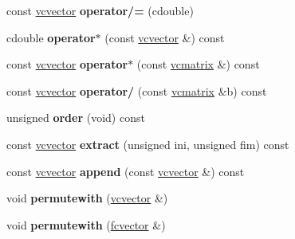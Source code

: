 \begin{DoxyCompactItemize}
\item 
const \hyperlink{classvcvector}{vcvector} {\bfseries operator/=} (cdouble)\hypertarget{classvcvector_ad7199f07b38e269bf8ae4dc72dceeb0d}{}\label{classvcvector_ad7199f07b38e269bf8ae4dc72dceeb0d}

\item 
cdouble {\bfseries operator$\ast$} (const \hyperlink{classvcvector}{vcvector} \&) const \hypertarget{classvcvector_a02c59cbf19976675c877bc0cfddc995a}{}\label{classvcvector_a02c59cbf19976675c877bc0cfddc995a}

\item 
const \hyperlink{classvcvector}{vcvector} {\bfseries operator$\ast$} (const \hyperlink{classvcmatrix}{vcmatrix} \&) const \hypertarget{classvcvector_a2ec6afa52a798942f721e375b96774cc}{}\label{classvcvector_a2ec6afa52a798942f721e375b96774cc}

\item 
const \hyperlink{classvcvector}{vcvector} {\bfseries operator/} (const \hyperlink{classvcmatrix}{vcmatrix} \&b) const \hypertarget{classvcvector_a510b7cf832d55c1f82e3941ec8645391}{}\label{classvcvector_a510b7cf832d55c1f82e3941ec8645391}

\item 
unsigned {\bfseries order} (void) const \hypertarget{classvcvector_ae698b7365cde3a60c82346e7cf63dec6}{}\label{classvcvector_ae698b7365cde3a60c82346e7cf63dec6}

\item 
const \hyperlink{classvcvector}{vcvector} {\bfseries extract} (unsigned ini, unsigned fim) const \hypertarget{classvcvector_a8ee3d0ed796d83154a02dce446b699f2}{}\label{classvcvector_a8ee3d0ed796d83154a02dce446b699f2}

\item 
const \hyperlink{classvcvector}{vcvector} {\bfseries append} (const \hyperlink{classvcvector}{vcvector} \&) const \hypertarget{classvcvector_a0c3e10d7660127d0ca88e2d85bed7f92}{}\label{classvcvector_a0c3e10d7660127d0ca88e2d85bed7f92}

\item 
void {\bfseries permutewith} (\hyperlink{classvcvector}{vcvector} \&)\hypertarget{classvcvector_a867aaddc6e2c902bf97d3f838af537cc}{}\label{classvcvector_a867aaddc6e2c902bf97d3f838af537cc}

\item 
void {\bfseries permutewith} (\hyperlink{classfcvector}{fcvector} \&)\hypertarget{classvcvector_a8afd42e12b912d0520a7bc593521e5e7}{}\label{classvcvector_a8afd42e12b912d0520a7bc593521e5e7}


\end{DoxyCompactItemize}
